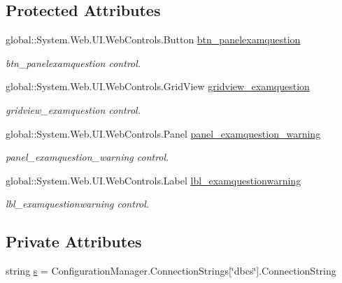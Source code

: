 \subsection*{Protected Attributes}
\begin{DoxyCompactItemize}
\item 
global\+::\+System.\+Web.\+U\+I.\+Web\+Controls.\+Button \mbox{\hyperlink{class_admin__view_question_a224ed62011ccfaffde0fdbfdcbeb0ec7}{btn\+\_\+panelexamquestion}}
\begin{DoxyCompactList}\small\item\em btn\+\_\+panelexamquestion control. \end{DoxyCompactList}\item 
global\+::\+System.\+Web.\+U\+I.\+Web\+Controls.\+Grid\+View \mbox{\hyperlink{class_admin__view_question_ae215f4872b017d9be1bd94daa550872a}{gridview\+\_\+examquestion}}
\begin{DoxyCompactList}\small\item\em gridview\+\_\+examquestion control. \end{DoxyCompactList}\item 
global\+::\+System.\+Web.\+U\+I.\+Web\+Controls.\+Panel \mbox{\hyperlink{class_admin__view_question_ae154f3ebefb084c15b09d2bb6198bcf3}{panel\+\_\+examquestion\+\_\+warning}}
\begin{DoxyCompactList}\small\item\em panel\+\_\+examquestion\+\_\+warning control. \end{DoxyCompactList}\item 
global\+::\+System.\+Web.\+U\+I.\+Web\+Controls.\+Label \mbox{\hyperlink{class_admin__view_question_a2f6b68dbe16ebda8ae5091b02bd0a2ab}{lbl\+\_\+examquestionwarning}}
\begin{DoxyCompactList}\small\item\em lbl\+\_\+examquestionwarning control. \end{DoxyCompactList}\end{DoxyCompactItemize}
\subsection*{Private Attributes}
\begin{DoxyCompactItemize}
\item 
string \mbox{\hyperlink{class_admin__view_question_a79bad91cca34b62ba23dfae02f89b9ee}{s}} = Configuration\+Manager.\+Connection\+Strings\mbox{[}\char`\"{}dbcs\char`\"{}\mbox{]}.Connection\+String
\end{DoxyCompactItemize}


